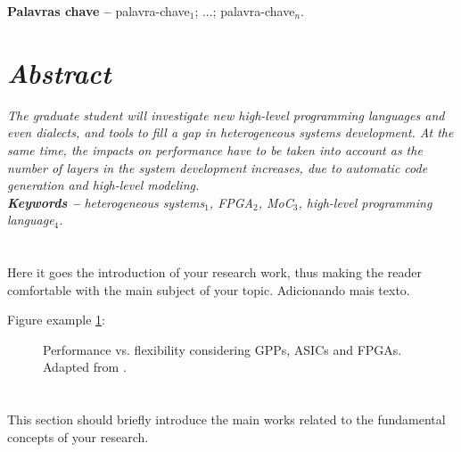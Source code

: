 \textbf{Palavras chave --} palavra-chave$_1$; ...; palavra-chave$_n$.


\newpage
\section*{\textit{Abstract}}
\textit{
  The graduate student will investigate new high-level programming languages and even dialects, and tools to fill a gap in heterogeneous systems development. At the same time, the impacts on performance have to be taken into account as the number of layers in the system development increases, due to automatic code generation and high-level modeling.
}\\%

\textit{\textbf{Keywords --} heterogeneous systems$_1$, FPGA$_2$, MoC$_3$, high-level programming language$_4$.}


\newpage
\section{\sectionI}
\label{sec:intro}
Here it goes the introduction of your research work, thus making the reader comfortable with the main subject of your topic. Adicionando mais texto.

Figure example \ref{fig:perf_flex}:

\begin{figure}[ht]
	\centering
	\caption{Performance vs. flexibility considering GPPs, ASICs and FPGAs.
	  Adapted from \cite{Bobda2007a}.}
	\label{fig:perf_flex}
\end{figure}


\section{\sectionII}
\label{sec:rel-work}
This section should briefly introduce the main works related to the fundamental concepts of your research.

